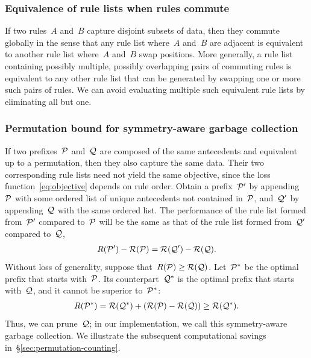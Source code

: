 \subsubsection{Equivalence of rule lists when rules commute}

If two rules~$A$ and~$B$ capture disjoint subsets of data,
then they commute globally in the sense that any rule list where~$A$ and~$B$ are
adjacent is equivalent to another rule list where~$A$ and~$B$ swap positions.
%
More generally, a rule list containing possibly multiple, possibly overlapping
pairs of commuting rules is equivalent to any other rule list that can be generated
by swapping one or more such pairs of rules.
%
We can avoid evaluating multiple such equivalent rule lists by eliminating all but one.
%

\subsubsection{Permutation bound for symmetry-aware garbage collection}
\label{sec:permutation}

If two prefixes~$\cal{P}$ and~$\cal{Q}$ are composed of the same antecedents and
equivalent up to a permutation, then they also capture the same data.
%
Their two corresponding rule lists need not yield the same objective, since the
loss function~\eqref{eq:objective} depends on rule order.
%
Obtain a prefix~$\cal{P}'$ by appending~$\cal{P}$ with some ordered list of
unique antecedents not contained in~$\cal{P}$, and~$\cal{Q}'$ by appending~$\cal{Q}$
with the same ordered list.
%
The performance of the rule list formed from~$\cal{P}'$ compared to~$\cal{P}$ will be
the same as that of the rule list formed from~$\cal{Q}'$ compared to~$\cal{Q}$, \ie
\begin{align}
\Obj(\cal{P}') - \Obj(\cal{P}) = \Obj(\cal{Q}') - \Obj(\cal{Q}).
\end{align}
Without loss of generality, suppose that~${R(\cal{P}) \ge R(\cal{Q})}$.
%
Let~$\cal{P}^*$ be the optimal prefix that starts with~$\cal{P}$.
%
Its counterpart~$\cal{Q}^*$ is the optimal prefix that starts with~$\cal{Q}$,
and it cannot be superior to~$\cal{P^*}$:
%
\begin{align}
\Obj(\cal{P}^*) = \Obj(\cal{Q^*}) + (\Obj(\cal{P}) - \Obj(\cal{Q})) \ge \Obj(\cal{Q^*}).
\label{eq:permutation}
\end{align}
%
Thus, we can prune~$\cal{Q}$;
in our implementation, we call this symmetry-aware garbage collection.
%
We illustrate the subsequent computational savings in~\S\ref{sec:permutation-counting}.

